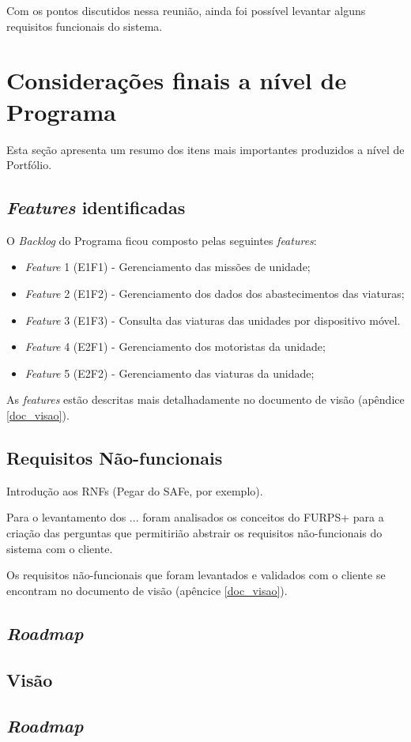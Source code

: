       Com os pontos discutidos nessa reunião, ainda foi possível levantar alguns requisitos funcionais do sistema.
  
  \section{Considerações finais a nível de Programa}
    
    Esta seção apresenta um resumo dos itens mais importantes produzidos a nível de Portfólio.
    
    \subsection{\textit{Features} identificadas}
      
      O \textit{Backlog} do Programa ficou composto pelas seguintes \textit{features}:
      
      \begin{itemize}
       \item \textit{Feature} 1 (E1F1) - Gerenciamento das missões de unidade;
       \item \textit{Feature} 2 (E1F2) - Gerenciamento dos dados dos abastecimentos das viaturas;
       \item \textit{Feature} 3 (E1F3) - Consulta das viaturas das unidades por dispositivo móvel. 
       \item \textit{Feature} 4 (E2F1) - Gerenciamento dos motoristas da unidade;
       \item \textit{Feature} 5 (E2F2) - Gerenciamento das viaturas da unidade;
      \end{itemize}
      
      As \textit{features} estão descritas mais detalhadamente no documento de visão (apêndice \ref{doc_visao}).
              
    \subsection{Requisitos Não-funcionais}
    
          Introdução aos RNFs (Pegar do SAFe, por exemplo).
      
	  Para o levantamento dos ... foram analisados os conceitos do FURPS+ para a criação das perguntas que permitirião abstrair 
	  os requisitos não-funcionais do sistema com o cliente.
	  
	  Os requisitos não-funcionais que foram levantados e validados com o cliente se encontram no
	  documento de visão (apêncice \ref{doc_visao}).
      
    \subsection{\textit{Roadmap}}
      
      
    \subsection{Visão}
      
      
    \subsection{\textit{Roadmap}}
    
      
      
